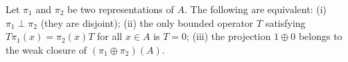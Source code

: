 Let $\pi_1$ and $\pi_2$ be two representations of $A$. The following are equivalent: (i) $\pi_1 \perp \pi_2$ (they are disjoint); (ii) the only bounded operator $T$ satisfying $T\pi_1(x) = \pi_2(x)T$ for all $x \in A$ is $T = 0$; (iii) the projection $1 \oplus 0$ belongs to the weak closure of $(\pi_1 \oplus \pi_2)(A)$.
